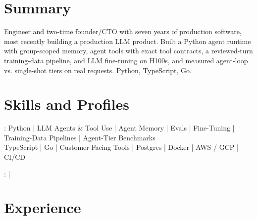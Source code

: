 \documentclass[print]{jack-resume}
\begin{document}
\pagecolor{darkmodeBackground}


\begin{minipage}[t][1cm][t]{.03\textwidth}
    \hfill
\end{minipage}

\section{Summary}
Engineer and two-time founder/CTO with seven years of production software, most recently building a production LLM product. Built a Python agent runtime with group-scoped memory, agent tools with exact tool contracts, a reviewed-turn training-data pipeline, and LLM fine-tuning on H100s, and measured agent-loop vs. single-shot tiers on real requests. Python, TypeScript, Go.
\sectionsep

\section{Skills and Profiles}
:
Python \hfill | \hfill
LLM Agents \& Tool Use \hfill | \hfill
Agent Memory \hfill | \hfill
Evals \hfill | \hfill
Fine-Tuning \hfill | \hfill
Training-Data Pipelines \hfill | \hfill
Agent-Tier Benchmarks \\
\hspace{1.0cm} TypeScript \hfill | \hfill
Go \hfill | \hfill
Customer-Facing Tools \hfill | \hfill
Postgres \hfill | \hfill
Docker \hfill | \hfill
AWS / GCP \hfill | \hfill
CI/CD \\

\raggedright{
    :
      \href{https://www.linkedin.com/in/jack-sturtevant/}{ \ExternalLink} |
     \href{https://github.com/jacksturt}{ \ExternalLink}}

\section{Experience}
\end{document}
